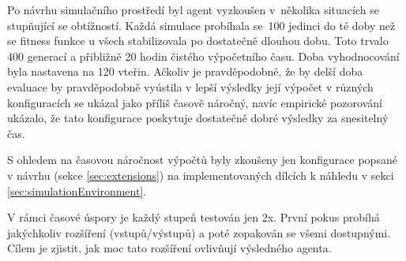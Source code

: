 Po návrhu simulačního prostředí byl agent vyzkoušen v~několika situacích se stupňující se obtížností. Každá simulace probíhala se~100 jedinci do té doby než se fitness funkce u všech stabilizovala po dostatečně dlouhou dobu. Toto trvalo 400 generací a přibližně 20 hodin čistého výpočetního času. Doba vyhodnocování byla nastavena na 120 vteřin. Ačkoliv je pravděpodobné, že by delší doba evaluace by pravděpodobně vyústila v lepší výsledky její výpočet v různých konfiguracích se ukázal jako příliš časově náročný, navíc empirické pozorování ukázalo, že tato konfigurace poskytuje dostatečně dobré výsledky za snesitelný čas. 

S ohledem na časovou náročnost výpočtů byly zkoušeny jen konfigurace popsané v návrhu (sekce \ref{sec:extensions}) na implementovaných dílcích k náhledu v sekci \ref{sec:simulationEnvironment}.

V rámci časové úspory je každý stupeň testován jen 2x. První pokus probíhá jakýchkoliv rozšíření (vstupů/výstupů) a poté zopakován se všemi dostupnými. Cílem je zjistit, jak moc tato rozšíření ovlivňují výsledného agenta.

